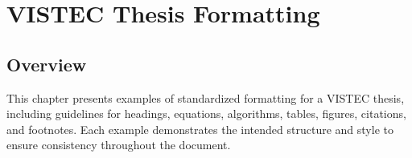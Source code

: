 \chapter{VISTEC Thesis Formatting}
\label{chapter3}

\section{Overview}
\begin{paragraph}
This chapter presents examples of standardized formatting for a VISTEC thesis, including guidelines for headings, equations, algorithms, tables, figures, citations, and footnotes. Each example demonstrates the intended structure and style to ensure consistency throughout the document.
\end{paragraph}






